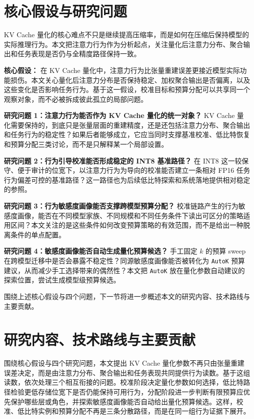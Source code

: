 \section{核心假设与研究问题}

KV Cache 量化的核心难点不只是继续提高压缩率，而是如何在压缩后保持模型的实际推理行为。本文把注意力行为作为分析起点，关注量化后注意力分布、聚合输出和任务表现是否仍与全精度路径保持一致。

\noindent\textbf{核心假设：} 在 KV Cache 量化中，注意力行为比张量重建误差更接近模型实际功能损伤。本文关心量化后注意力分布是否保持稳定、加权聚合输出是否偏离，以及这些变化是否影响任务行为。基于这一假设，校准目标和预算分配可以共享同一个观察对象，而不必被拆成彼此孤立的局部问题。

\noindent\textbf{研究问题 1：注意力行为能否作为 KV Cache 量化的统一对象？} KV Cache 量化需要保持的，到底只是张量层面的重建精度，还是还包括注意力分布、聚合输出和任务行为的稳定性？如果后者能够成立，它应当同时支撑基准校准、低比特恢复和预算分配三类讨论，而不是只解释某一个局部设置。

\noindent\textbf{研究问题 2：行为引导校准能否形成稳定的 INT8 基准路径？} 在 INT8 这一较保守、便于审计的位宽下，以注意力行为为导向的校准能否建立一条相对 FP16 任务行为偏差可控的基准路径？这一路径也为后续低比特探索和系统落地提供相对稳定的参照。

\noindent\textbf{研究问题 3：行为敏感度画像能否支撑跨模型预算分配？} 校准链路产生的行为敏感度画像，能否在不同模型家族、不同规模和不同任务条件下读出可区分的策略适用区间？本文关注的是这些条件如何改变预算策略的有效范围，而不是给出一种脱离条件的单点配置。

\noindent\textbf{研究问题 4：敏感度画像能否自动生成量化预算候选？} 手工固定 $k$ 的预算 sweep 在跨模型迁移中是否会暴露不稳定性？同源敏感度画像能否被转化为 \texttt{AutoK} 预算建议，从而减少手工选择带来的偶然性？本文把 \texttt{AutoK} 放在量化参数自动建议的探索位置，尝试生成模型级预算候选。

围绕上述核心假设与四个问题，下一节将进一步概述本文的研究内容、技术路线与主要贡献。

\section{研究内容、技术路线与主要贡献}
\label{sec:ch1-contribution}

围绕核心假设与四个研究问题，本文提出 KV Cache 量化参数不再只由张量重建误差决定，而是由注意力分布、聚合输出和任务表现共同提供行为读数。基于这组读数，依次处理三个相互衔接的问题。校准阶段决定量化参数如何选择，低比特路径检验更低存储位宽下是否仍能保持可用行为，分配阶段进一步判断有限预算应优先保护哪些层或角色，并探索敏感度画像能否自动给出量化预算候选。这样，校准、低比特实例和预算分配不再是三条分散路径，而是在同一组行为证据下展开。

